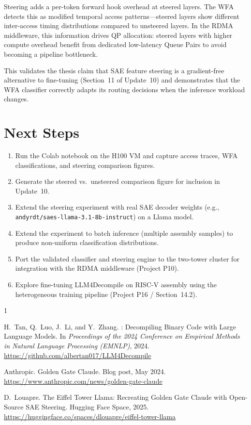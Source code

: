 \documentclass[11pt,letterpaper]{article}
\begin{document}
Steering adds a per-token forward hook overhead at steered layers. The WFA detects this as modified temporal access patterns---steered layers show different inter-access timing distributions compared to unsteered layers. In the RDMA middleware, this information drives QP allocation: steered layers with higher compute overhead benefit from dedicated low-latency Queue Pairs to avoid becoming a pipeline bottleneck.

This validates the thesis claim that SAE feature steering is a gradient-free alternative to fine-tuning (Section~11 of Update~10) and demonstrates that the WFA classifier correctly adapts its routing decisions when the inference workload changes.

\section{Next Steps}
\label{sec:next-steps}

\begin{enumerate}
    \item Run the Colab notebook on the H100 VM and capture access traces, WFA classifications, and steering comparison figures.
    \item Generate the steered vs.\ unsteered comparison figure for inclusion in Update~10.
    \item Extend the steering experiment with real SAE decoder weights (e.g., \texttt{andyrdt/saes-llama-3.1-8b-instruct}) on a Llama model.
    \item Extend the experiment to batch inference (multiple assembly samples) to produce non-uniform classification distributions.
    \item Port the validated classifier and steering engine to the two-tower cluster for integration with the RDMA middleware (Project P10).
    \item Explore fine-tuning LLM4Decompile on RISC-V assembly using the heterogeneous training pipeline (Project P16 / Section~14.2).
\end{enumerate}


\begin{thebibliography}{1}

H.~Tan, Q.~Luo, J.~Li, and Y.~Zhang.
: Decompiling Binary Code with Large Language Models.
\newblock In \emph{Proceedings of the 2024 Conference on Empirical Methods in Natural Language Processing (EMNLP)}, 2024.
\newblock \url{https://github.com/albertan017/LLM4Decompile}

Anthropic.
\newblock Golden Gate Claude.
\newblock Blog post, May 2024.
\newblock \url{https://www.anthropic.com/news/golden-gate-claude}

D.~Louapre.
\newblock The Eiffel Tower Llama: Recreating Golden Gate Claude with Open-Source SAE Steering.
\newblock Hugging Face Space, 2025.
\newblock \url{https://huggingface.co/spaces/dlouapre/eiffel-tower-llama}

\end{thebibliography}
\end{document}
